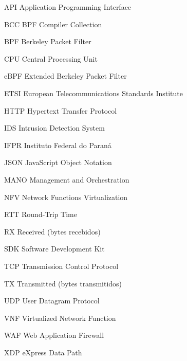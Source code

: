 \documentclass{ifpr-pinhais}
\begin{document}
\begin{siglas}
  \item[API]   Application Programming Interface
  \item[BCC]   BPF Compiler Collection
  \item[BPF]   Berkeley Packet Filter
  \item[CPU]   Central Processing Unit
  \item[eBPF]  Extended Berkeley Packet Filter
  \item[ETSI]  European Telecommunications Standards Institute
  \item[HTTP]  Hypertext Transfer Protocol
  \item[IDS]   Intrusion Detection System
  \item[IFPR]  Instituto Federal do Paraná
  \item[JSON]  JavaScript Object Notation
  \item[MANO]  Management and Orchestration
  \item[NFV]   Network Functions Virtualization
  \item[RTT]   Round-Trip Time
  \item[RX]    Received (bytes recebidos)
  \item[SDK]   Software Development Kit
  \item[TCP]   Transmission Control Protocol
  \item[TX]    Transmitted (bytes transmitidos)
  \item[UDP]   User Datagram Protocol
  \item[VNF]   Virtualized Network Function
  \item[WAF]   Web Application Firewall
  \item[XDP]   eXpress Data Path
\end{siglas}


\tableofcontents*
\cleardoublepage

\textual
\pagestyle{simple}







\postextual


\end{document}
